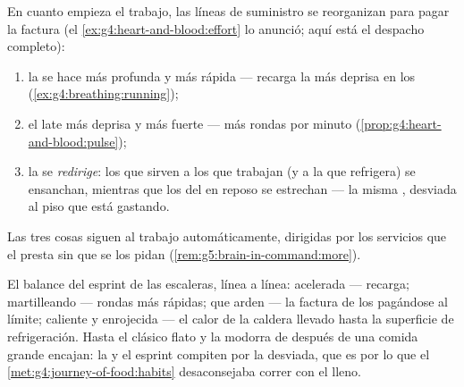 \begin{proposition}\label{prop:g7:organs-at-work:supply}
En cuanto empieza el trabajo, las líneas de suministro se reorganizan
para pagar la factura (el \cref{ex:g4:heart-and-blood:effort} lo
anunció; aquí está el despacho completo):
\begin{enumerate}
  \item la \emph{} se hace más profunda y más rápida ---
        recarga la  más deprisa en los 
        (\cref{ex:g4:breathing:running});
  \item el \emph{} late más deprisa y más fuerte --- más rondas
        por minuto (\cref{prop:g4:heart-and-blood:pulse});
  \item la  se \emph{redirige}: los  que sirven a los
         que trabajan (y a la  que refrigera) se
        ensanchan, mientras que los del  en reposo se
        estrechan --- la misma , desviada al piso que está
        gastando.
\end{enumerate}
Las tres cosas siguen al trabajo automáticamente, dirigidas por los
servicios que el  presta sin que se los pidan
(\cref{rem:g5:brain-in-command:more}).
\end{proposition}
\admitted

\begin{example}\label{ex:g7:organs-at-work:felt}
El balance del esprint de las escaleras, línea a línea: 
acelerada --- recarga;  martilleando --- rondas más rápidas;
 que arden --- la factura de los  pagándose al límite;
 caliente y enrojecida --- el calor de la caldera llevado hasta la
superficie de refrigeración. Hasta el clásico flato y la modorra de
después de una comida grande encajan: la  y el esprint compiten
por la  desviada, que es por lo que el
\cref{met:g4:journey-of-food:habits} desaconsejaba correr con el
 lleno.
\end{example}

